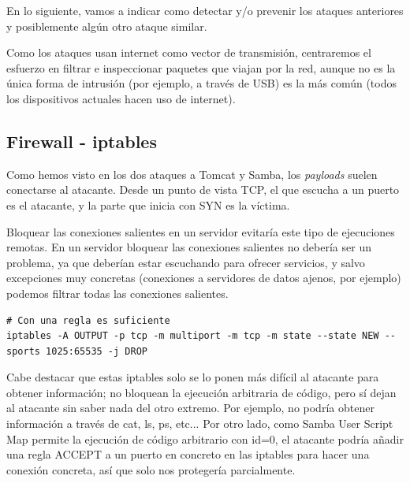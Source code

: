 \documentclass[a4paper,12pt]{scrartcl}
\begin{document}
En lo siguiente, vamos a indicar como detectar y/o prevenir los ataques anteriores y posiblemente algún otro ataque similar.


\vspace{10pt}

Como los ataques usan internet como vector de transmisión, centraremos el esfuerzo en filtrar e inspeccionar paquetes que viajan por la red, aunque no es la única forma de intrusión (por ejemplo, a través de USB) es la más común (todos los dispositivos actuales hacen uso de internet).

\subsection{Firewall - iptables}

Como hemos visto en los dos ataques a Tomcat y Samba, los \textit{payloads} suelen conectarse al atacante. Desde un punto de vista TCP, el que escucha a un puerto es el atacante, y la parte que inicia con SYN es la víctima. 

\vspace{10pt}

Bloquear las conexiones salientes en un servidor evitaría este tipo de ejecuciones remotas. En un servidor bloquear las conexiones salientes no debería ser un problema, ya que deberían estar escuchando para ofrecer servicios, y salvo excepciones muy concretas (conexiones a servidores de datos ajenos, por ejemplo) podemos filtrar todas las conexiones salientes.

\vspace{10pt}


\begin{lstlisting}[breaklines]
# Con una regla es suficiente
iptables -A OUTPUT -p tcp -m multiport -m tcp -m state --state NEW --sports 1025:65535 -j DROP
\end{lstlisting}

\vspace{10pt}

Cabe destacar que estas iptables solo se lo ponen más difícil al atacante para obtener información; no bloquean la ejecución arbitraria de código, pero sí dejan al atacante sin saber nada del otro extremo. Por ejemplo, no podría obtener información a través de cat, ls, ps, etc... Por otro lado, como Samba User Script Map permite la ejecución de código arbitrario con id=0, el atacante podría añadir una regla ACCEPT a un puerto en concreto en las iptables para hacer una conexión concreta, así que solo nos protegería parcialmente.
\end{document}
